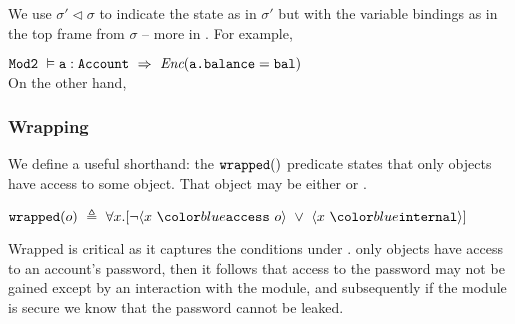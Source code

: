 We use ${\sigma' \triangleleft \sigma}$ to indicate the state as in $\sigma'$ but
with the variable bindings as in the top frame from $\sigma$ -- more in 
. 
For example, 
\\
\strut \hspace{1cm}
$\prg{Mod2}\ \vDash \prg{a}:\prg{Account}\ \Rightarrow\ \encaps{\prg{a.balance}=\prg{bal}}$
\\
On the other hand,
\\

\subsubsection{Wrapping}

We define a useful shorthand: the $\texttt{wrapped}(  )$ predicate  states 
that only \internalO objects have access to some object.
That object may be either \internalO or \externalO.
\begin{definition}[Wrapped]
$\wrapped{o}\ \triangleq\ \all{x}{\neg \access{x}{o}\ \vee\ \internal{x}}$
\end{definition}
Wrapped is critical as it captures the conditions under . 
 only \internalO
objects have access to an account's password, then
it follows that access to the password may not 
be gained except by an interaction with the \internalM
module, and subsequently if the \internalM module
is secure we know that the password cannot be leaked.
 
 

	
